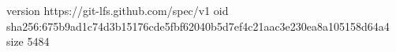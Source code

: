 version https://git-lfs.github.com/spec/v1
oid sha256:675b9ad1c74d3b15176cde5fbf62040b5d7ef4c21aac3e230ea8a105158d64a4
size 5484
